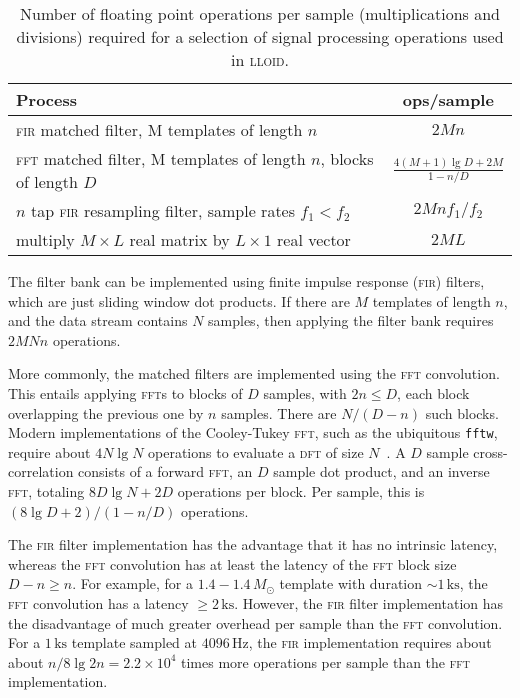 \begin{table}[htdp]
\caption{Number of floating point operations per sample (multiplications and
divisions) required for a selection of signal processing operations used in
\textsc{lloid}.}
\begin{center}
\setlength{\extrarowheight}{6pt}
\begin{tabular}{l c}
\hline
Process & ops/sample \\
\hline\hline
\textsc{fir} matched filter, M templates of length $n$ & $2 M n$ \\\hline
\textsc{fft} matched filter, M templates of length $n$, blocks of length $D$ & $\frac{4 (M + 1) \lg D + 2 M}{1 - n/D}$ \\\hline
$n$ tap \textsc{fir} resampling filter, sample rates $f_1 < f_2$ & $2 M n f_1 / f_2$ \\\hline
multiply $M \times L$ real matrix by $L\times1$ real vector & $2 M L$ \\\hline
\end{tabular}
\end{center}
\label{table:flops}
\end{table}%


The filter bank can be implemented using finite impulse response (\textsc{fir})
filters, which are just sliding window dot products.  If there are $M$
templates of length $n$, and the data stream contains $N$ samples, then
applying the filter bank requires $2 M N n$ operations.

More commonly, the matched filters are implemented using the \textsc{fft}
convolution.  This entails applying \textsc{fft}s to blocks of $D$ samples,
with $2 n \leq D$, each block overlapping the previous one by $n$ samples.
There are $N/(D-n)$ such blocks.  Modern implementations of the Cooley-Tukey
\textsc{fft}, such as the ubiquitous \texttt{fftw}, require about $4 N \lg N$
operations to evaluate a \textsc{dft} of size $N$~\cite{Johnson:2007p9654}.
  A $D$ sample cross-correlation
consists of a forward \textsc{fft}, an $D$ sample dot product, and an inverse
\textsc{fft}, totaling $8 D \lg N + 2 D$ operations per block.  Per sample,
this is $(8 \lg D + 2) / (1 - n/D)$ operations. 

The \textsc{fir} filter implementation has the advantage that it has no
intrinsic latency, whereas the \textsc{fft} convolution has at least the
latency of the \textsc{fft} block size $D-n \geq n$. For example, for a $1.4 -
1.4 \, M_\odot$ template with duration $\sim 1 \, \mathrm{ks}$, the
\textsc{fft} convolution has a latency $\geq 2 \, \mathrm{ks}$.  However, the
\textsc{fir} filter implementation has the disadvantage of much greater
overhead per sample than the \textsc{fft} convolution.  For a $1\,\mathrm{ks}$
template sampled at $4096\,\mathrm{Hz}$, the \textsc{fir} implementation
requires about about $n / 8 \lg 2 n = 2.2 \times 10^4$ times more operations
per sample than the \textsc{fft} implementation.


